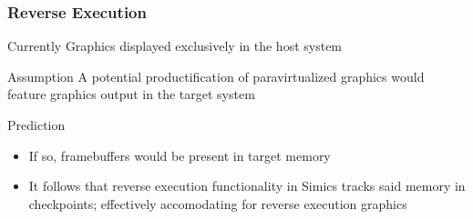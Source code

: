 
\begin{frame}

\frametitle{Reverse Execution}

\begin{block}{Currently}
	Graphics displayed exclusively in the host system
\end{block}

\begin{block}{Assumption}
	A potential productification of paravirtualized graphics would feature graphics output in the target system
\end{block}

\begin{block}{Prediction}
	\begin{itemize}
		\item If so, framebuffers would be present in target memory
		\item It follows that reverse execution functionality in Simics tracks said memory in checkpoints; effectively accomodating for reverse execution graphics
	\end{itemize}
\end{block}

\end{frame}
